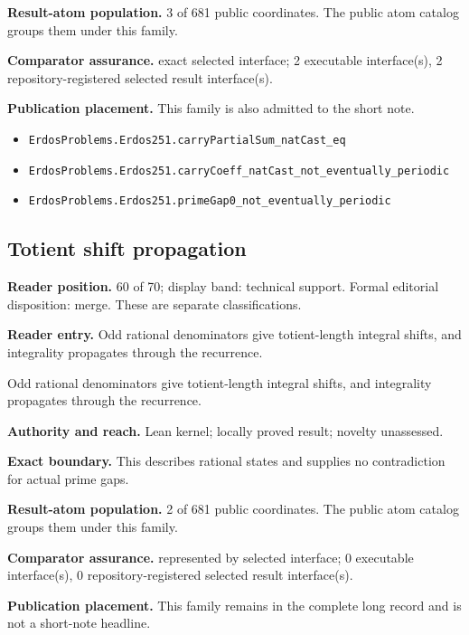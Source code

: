 \documentclass[11pt]{article}
\begin{document}
\textbf{Result-atom population.} 3 of 681 public coordinates. The public atom catalog groups them under this family.

\textbf{Comparator assurance.} exact selected interface; 2 executable interface(s), 2 repository-registered selected result interface(s).

\textbf{Publication placement.} This family is also admitted to the short note.

\begin{itemize}
  \item \nolinkurl{ErdosProblems.Erdos251.carryPartialSum_natCast_eq}
  \item \nolinkurl{ErdosProblems.Erdos251.carryCoeff_natCast_not_eventually_periodic}
  \item \nolinkurl{ErdosProblems.Erdos251.primeGap0_not_eventually_periodic}
\end{itemize}

\subsection{Totient shift propagation}
\textbf{Reader position.} 60 of 70; display band: technical support.  Formal editorial disposition: merge.  These are separate classifications.

\textbf{Reader entry.} Odd rational denominators give totient-length integral shifts, and integrality propagates through the recurrence.

Odd rational denominators give totient-length integral shifts, and integrality propagates through the recurrence.

\textbf{Authority and reach.} Lean kernel; locally proved result; novelty unassessed.

\textbf{Exact boundary.} This describes rational states and supplies no contradiction for actual prime gaps.

\textbf{Result-atom population.} 2 of 681 public coordinates. The public atom catalog groups them under this family.

\textbf{Comparator assurance.} represented by selected interface; 0 executable interface(s), 0 repository-registered selected result interface(s).

\textbf{Publication placement.} This family remains in the complete long record and is not a short-note headline.
\end{document}
